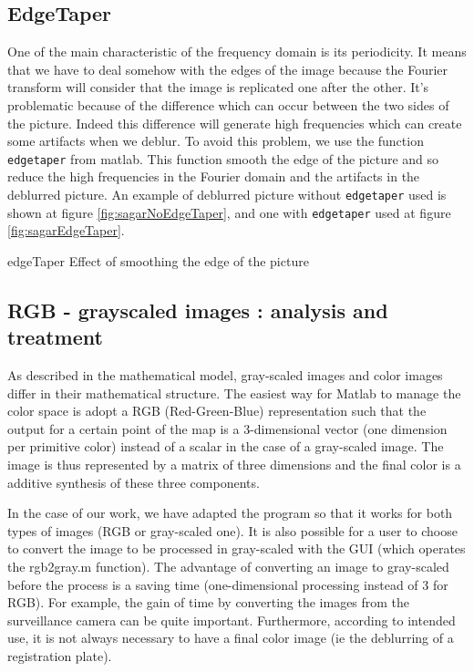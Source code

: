 \subsection{EdgeTaper}
One of the main characteristic of the frequency domain is its periodicity. It means that we have to deal somehow with the edges of the image because the Fourier transform will consider that the image is replicated one after the other. It's problematic because of the difference which can occur between the two sides of the picture. Indeed this difference will generate high frequencies which can create some artifacts  when we deblur. 
To avoid this problem, we use the function \texttt{edgetaper} from matlab. This function smooth the edge of the picture and so reduce the high frequencies in the Fourier domain and the artifacts in the deblurred picture. 
An example of deblurred picture without \texttt{edgetaper} used is shown at figure \ref{fig:sagarNoEdgeTaper}, and one with \texttt{edgetaper} used at figure \ref{fig:sagarEdgeTaper}.
\begin{myfig}{edgeTaper}
  {Effect of smoothing the edge of the picture}
\end{myfig}




\subsection{RGB - grayscaled images : analysis and treatment}

As described in the mathematical model, gray-scaled images and color images differ in their mathematical structure. The easiest way for Matlab to manage the color space is adopt a RGB (Red-Green-Blue) representation such that the output for a certain point of the map is a 3-dimensional vector (one dimension per primitive color) instead of a scalar in the case of a gray-scaled image. The image is thus represented by a matrix of three dimensions and the final color is a additive synthesis of these three components.
 
In the case of our work, we have adapted the program so that it works for both types of images (RGB or gray-scaled one). It is also possible for a user to choose to convert the image to be processed in gray-scaled with the GUI (which operates the rgb2gray.m function). The advantage of converting an image to gray-scaled before the process is a saving time (one-dimensional processing instead of 3 for RGB). For example, the gain of time by converting the images from the surveillance camera can be quite important. Furthermore, according to intended use, it is not always necessary to have a final color image (ie the deblurring of a registration plate).